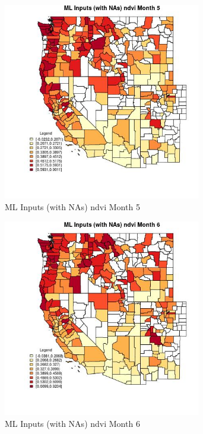 \begin{figure} 
\centering  
\includegraphics[width=0.77\textwidth]{Code_Outputs/Report_ML_input_PM25_Step4_part_e_de_duplicated_aves_compiled_2019-05-21wNAs_CountyndvimedianMonth5.jpg} 
\caption{\label{fig:Report_ML_input_PM25_Step4_part_e_de_duplicated_aves_compiled_2019-05-21wNAsCountyndvimedianMonth5}ML Inputs (with NAs) ndvi Month 5} 
\end{figure} 
 

\begin{figure} 
\centering  
\includegraphics[width=0.77\textwidth]{Code_Outputs/Report_ML_input_PM25_Step4_part_e_de_duplicated_aves_compiled_2019-05-21wNAs_CountyndvimedianMonth6.jpg} 
\caption{\label{fig:Report_ML_input_PM25_Step4_part_e_de_duplicated_aves_compiled_2019-05-21wNAsCountyndvimedianMonth6}ML Inputs (with NAs) ndvi Month 6} 
\end{figure} 
 

